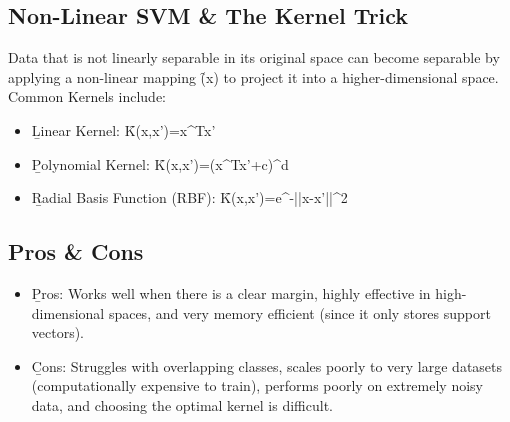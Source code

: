 \subsection{Non-Linear SVM \& The Kernel Trick}
Data that is not linearly separable in its original space can become separable by applying a non-linear mapping \f{\phi(x)} to project it into a higher-dimensional space.
\vspace{.5em}
Common Kernels include:
\begin{itemize}
\item \b{Linear Kernel}: \f{K(x,x')=x^Tx'} 
\item \b{Polynomial Kernel}: \f{K(x,x')=(x^Tx'+c)^d}
\item \b{Radial Basis Function (RBF)}: \f{K(x,x')=e^{-\gamma||x-x'||^2}}
\end{itemize}


\subsection{Pros \& Cons}

\begin{itemize}
\item \b{Pros}: Works well when there is a clear margin, highly effective in high-dimensional spaces, and very memory efficient (since it only stores support vectors).
\item \b{Cons}: Struggles with overlapping classes, scales poorly to very large datasets (computationally expensive to train), performs poorly on extremely noisy data, and choosing the optimal kernel is difficult.
\end{itemize}

